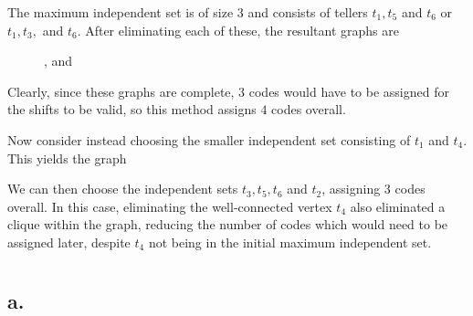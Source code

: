 \documentclass[11pt]{article}
\begin{document}
 The maximum independent set is of size $3$ and consists of tellers $t_1, t_5$ and $t_6$ or $t_1, t_3, $ and $t_6$. After eliminating each of these, the resultant graphs are 
 \begin{figure}[H]
    \centering
    , and
 \end{figure}
 Clearly, since these graphs are complete, $3$ codes would have to be assigned for the shifts to be valid, so this method assigns $4$ codes overall.

 Now consider instead choosing the smaller independent set consisting of $t_1$ and $t_4$. This yields the graph
 \begin{figure}[H]
    \centering
 \end{figure}
 We can then choose the independent sets $t_3, t_5, t_6$ and $t_2$, assigning $3$ codes overall. In this case, eliminating the well-connected vertex $t_4$ also eliminated a clique within the graph, reducing the number of codes which would need to be assigned later, despite $t_4$ not being in the initial maximum independent set.

\section{}
\subsection*{a.}
\end{document}
